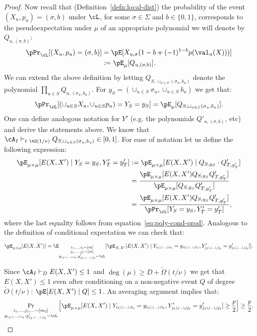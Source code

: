 \begin{proof}
Now recall that (Definition~\ref{defn:local-dist}) the probability of the event $(X_u,p_u) =  (\sigma,b)$ under $\cL$, for some $\sigma \in \Sigma$ and $b \in \{0,1\}$, corresponds to the pseudoexpectation under $\mu$ of an appropriate polynomial we will denote by $Q_{u,(\sigma,b)}$:
\begin{align}\label{eq:poly-cond}
\pPr_{\cL}[(X_u, p_u) = (\sigma, b)] &= \pE[X_{u,\sigma}(1-b + (-1)^{1-b}p(\val_u(X)))] \nonumber \\
&:= \pE_\mu[Q_{u,(\sigma,b)}].
\end{align}
We can extend the above definition by letting $Q_{S, \cup_{u \in S} (\sigma_u,b_u)}$ denote the polynomial $\prod_{u \in S} Q_{u,(\sigma_u,b_u)}$. For $y_S = (\cup_{u \in S} \sigma_u, \cup_{u \in S} b_u)$ we get that:
\begin{align}\label{eq:poly-cond-prod}
\pPr_{\cL}[(\cup_{u \in S} X_u, \cup_{u \in S} p_u) = Y_S = y_S] = \pE_\mu[Q_{S,\cup_{u \in S}(\sigma_u,b_u)}].
\end{align}
One can define analogous notation for $Y'$ (e.g. the polynomials $Q'_{u,(\sigma,b)}$, etc) and derive the statements above. We know that $\cA_I \vdash_{t~\tO(1/\nu)} Q_{S, \cup_{u \in S} (\sigma_u,b_u)} \in [0,1]$. For ease of notation let us define the following expression:
\begin{align*}
\pE_{\mu \times \mu}[E(X,X') \mid Y_S = y_S, Y'_T = y'_T] &:= \pE_{\mu \times \mu}[E(X,X') \mid  Q_{S, y_S} \cdot  Q'_{T, y'_T}] \\
&= \frac{\pE_{\mu \times \mu}[E(X,X')Q_{S, y_S} Q'_{T, y'_T}]}{\pE_{\mu \times \mu}[Q_{S, y_S} Q'_{T, y'_T}]} \\
&= \frac{\pE_{\mu \times \mu}[E(X,X')Q_{S, y_S} Q'_{T, y'_T}]}{\pPr_{\cL}[Y_{S} = y_{S}, Y'_{T} = y'_{T}]},
\end{align*}
where the last equality follows from equation~\eqref{eq:poly-cond-prod}. Analogous to the definition of conditional expectation we can check that:
\[\pE_{\mu \times \mu}[E(X,X')] = \E_{\substack{i_1,\ldots,i_t \sim [m] \\ j_1,\ldots,j_t \sim [m] \\ y_{i_1 \cup \ldots \cup i_t}, y'_{j_1 \cup \ldots \cup j_t} \sim \cL}}[\pE_{X,X'}[E(X,X') \mid Y_{i_1 \cup \ldots \cup i_t} = y_{i_1 \cup \ldots \cup i_t}, Y'_{j_1 \cup \ldots \cup j_t} = y'_{j_1 \cup \ldots \cup j_t}]].\]

Since $\cA_I \vdash_D E(X,X') \leq 1$ and $\deg(\mu) \geq D + \widetilde{\Omega}(t/\nu)$ we get that $E(X,X') \leq 1$ even after conditioning on a non-negative event $Q$ of degree $\widetilde{O}(t/\nu)$: $\pE[E(X,X') \mid Q] \leq 1$. An averaging argument implies that:
\begin{equation}\label{eq:avg3}
\Pr_{\substack{i_1,\ldots, j_1,\ldots \sim [m_2] \\ y_{i_1 \cup \ldots \cup i_t},y'_{j_1 \cup \ldots \cup j_t} \sim \cL}}\left[\pE_{\mu \times \mu}[E(X,X') \mid Y_{i_1 \cup \ldots \cup i_t} = y_{i_1 \cup \ldots \cup i_t}, Y'_{j_1 \cup \ldots \cup j_t} = y'_{j_1 \cup \ldots \cup j_t}] \geq \frac{p}{2}\right] \geq \frac{p}{2}.
\end{equation}


\end{proof}

